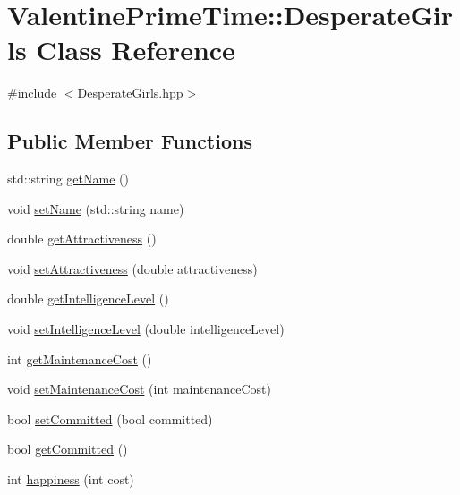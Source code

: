 \hypertarget{classValentinePrimeTime_1_1DesperateGirls}{}\section{Valentine\+Prime\+Time\+:\+:Desperate\+Girls Class Reference}
\label{classValentinePrimeTime_1_1DesperateGirls}


{\ttfamily \#include $<$Desperate\+Girls.\+hpp$>$}

\subsection*{Public Member Functions}
\begin{DoxyCompactItemize}
\item 
std\+::string \hyperlink{classValentinePrimeTime_1_1DesperateGirls_ab571f4c85248b66956779db2b50223b2}{get\+Name} ()
\item 
void \hyperlink{classValentinePrimeTime_1_1DesperateGirls_a226957c5f2c682c3ad8f05bc7809a336}{set\+Name} (std\+::string name)
\item 
double \hyperlink{classValentinePrimeTime_1_1DesperateGirls_adc83beb72cb1e3860239f8c0e834aec9}{get\+Attractiveness} ()
\item 
void \hyperlink{classValentinePrimeTime_1_1DesperateGirls_ae3eb69eb885c5684f280482531c27ea7}{set\+Attractiveness} (double attractiveness)
\item 
double \hyperlink{classValentinePrimeTime_1_1DesperateGirls_a3b770a8c2e99298b265156fad9242842}{get\+Intelligence\+Level} ()
\item 
void \hyperlink{classValentinePrimeTime_1_1DesperateGirls_aa5d6bbe606f0e4bc8aa1b16f064e6d3e}{set\+Intelligence\+Level} (double intelligence\+Level)
\item 
int \hyperlink{classValentinePrimeTime_1_1DesperateGirls_ae59375aef119d322fb3c03fe0b2faa04}{get\+Maintenance\+Cost} ()
\item 
void \hyperlink{classValentinePrimeTime_1_1DesperateGirls_aa4648ae2b3997f5b5e743b2b8ff16369}{set\+Maintenance\+Cost} (int maintenance\+Cost)
\item 
bool \hyperlink{classValentinePrimeTime_1_1DesperateGirls_a8488574d99818a9a8ab689570745a4fe}{set\+Committed} (bool committed)
\item 
bool \hyperlink{classValentinePrimeTime_1_1DesperateGirls_af6fca5df53e1b32147ca2b578464f8bd}{get\+Committed} ()
\item 
int \hyperlink{classValentinePrimeTime_1_1DesperateGirls_a39540b0893ca3251cfedcae1763f0dbc}{happiness} (int cost)
\end{DoxyCompactItemize}


